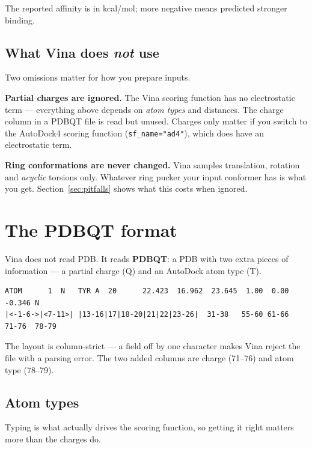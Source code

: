 \documentclass[11pt,a4paper]{article}
\newcommand{\code}[1]{\texttt{#1}}
\newcommand{\pitfall}[1]{\textcolor{warn}{\textbf{#1}}}
\begin{document}
The reported affinity is in kcal/mol; more negative means predicted stronger
binding.

\subsection*{What Vina does \emph{not} use}

Two omissions matter for how you prepare inputs.

\pitfall{Partial charges are ignored.} The Vina scoring function has no
electrostatic term --- everything above depends on \emph{atom types} and distances.
The charge column in a PDBQT file is read but unused. Charges only matter if you
switch to the AutoDock4 scoring function (\code{sf\_name="ad4"}), which does have an
electrostatic term.

\pitfall{Ring conformations are never changed.} Vina samples translation, rotation
and \emph{acyclic} torsions only. Whatever ring pucker your input conformer has is
what you get. Section~\ref{sec:pitfalls} shows what this costs when ignored.

\section{The PDBQT format}

Vina does not read PDB. It reads \textbf{PDBQT}: a PDB with two extra pieces of
information --- a partial charge (Q) and an AutoDock atom type (T).

\begin{lstlisting}
ATOM      1  N   TYR A  20      22.423  16.962  23.645  1.00  0.00    -0.346 N
|<-1-6->|<7-11>| |13-16|17|18-20|21|22|23-26|  31-38   55-60 61-66     71-76  78-79
\end{lstlisting}

The layout is column-strict --- a field off by one character makes Vina reject the
file with a parsing error. The two added columns are charge (71--76) and atom type
(78--79).

\subsection*{Atom types}

Typing is what actually drives the scoring function, so getting it right matters
more than the charges do.
\end{document}
